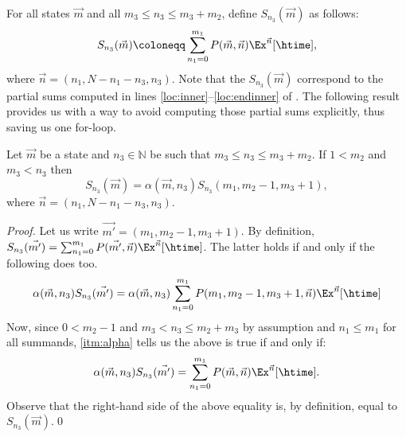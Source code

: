For all states $\vec{m}$ and all $m_3 \leq n_3 \leq m_3+m_2$, define $S_{n_3}(\vec{m})$ as follows:
\[
    S_{n_3}(\vec{m}) \coloneqq \sum_{n_1=0}^{m_1} P(\vec{m},\vec{n})\Ex^{\vec{n}}[\htime],
\]
where $\vec{n} = (n_1,N-n_1-n_3,n_3)$. Note that the $S_{n_3}(\vec{m})$ correspond to the partial sums computed in lines \ref{loc:inner}--\ref{loc:endinner} of . The following result provides us with a way to avoid computing those partial sums explicitly, thus saving us one for-loop.

\begin{lemma}\label{lem:sn3-props}
    Let $\vec{m}$ be a state and $n_3 \in \mathbb{N}$ be such that $m_3 \leq n_3 \leq m_3 + m_2$.
    If $1 < m_2$ and $m_3 < n_3$ then
    \[
        S_{n_3}(\vec{m}) = \alpha(\vec{m},n_3) S_{n_3}(m_1,m_2-1,m_3+1),
      \]
    where $\vec{n} = (n_1,N-n_1-n_3,n_3)$.
\end{lemma}
\begin{proof}
    Let us write $\vec{m'} = (m_1,m_2-1,m_3+1)$. By definition, $S_{n_3}(\vec{m'})=\sum_{n_1=0}^{m_1} P(\vec{m'},\vec{n}) \Ex^{\vec{n}}[\htime]$. The latter holds if and only if the following does too.
    \[
        \alpha(\vec{m},n_3) S_{n_3}(\vec{m'}) = \alpha(\vec{m},n_3) \sum_{n_1=0}^{m_1} P(m_1,m_2-1,m_3+1,\vec{n}) \Ex^{\vec{n}}[\htime]
    \]
    Now, since $0<m_2-1$ and $m_3 < n_3 \leq m_2 + m_3$ by assumption and $n_1 \leq m_1$ for all summands,  \cref{itm:alpha} tells us the above is true if and only if:
    \[
        \alpha(\vec{m},n_3) S_{n_3}(\vec{m'}) = \sum_{n_1=0}^{m_1} P(\vec{m},\vec{n}) \Ex^{\vec{n}}[\htime].
    \]
    Observe that the right-hand side of the above equality is, by definition,
    equal to $S_{n_3}(\vec{m})$.\qed
\end{proof}


